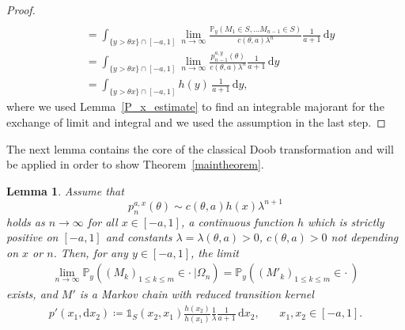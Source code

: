 \documentclass[12pt]{article}
\renewcommand{\P}{\mathbb{P}} %
\newcommand{\1}{\mathds{1}}
\renewcommand{\d}{\mathrm{d}}
\theoremstyle{definition}
\theoremstyle{plain}
\newtheorem{Lemma}[definition]{Lemma}
\theoremstyle{remark}
\begin{document}
\begin{proof}
\begin{align*}
      \\&\overset{ }{=}\int_{\{y>\theta x\}\cap[-a,1]}\lim_{n\to\infty}\frac{\P_y(M_1\in S,\dots M_{n-1}\in S)}{c(\theta,a)\lambda^{n}}\frac{1}{a+1}\,\d y
      \\&=\int_{\{y>\theta x\}\cap[-a,1]}\lim_{n\to\infty}\frac{p_{n-1}^{a,y}(\theta)}{c(\theta,a)\lambda^{n}}\frac{1}{a+1}\,\d y
      \\&=\int_{\{y>\theta x\}\cap[-a,1]}h(y)\,\frac{1}{a+1}\,\d y,
\end{align*}
where we used Lemma~\ref{P_x_estimate} to find an integrable majorant for the exchange of limit and integral and we used the assumption in the last step. %
\end{proof}
The next lemma contains the core of the classical Doob transformation and will be applied in order to show Theorem~\ref{maintheorem}.
\begin{Lemma}\label{Prob=Lim_int_trans_kernel}
Assume that
  $$p_n^{a,x}(\theta)\sim c(\theta,a)h(x)\lambda^{n+1}$$
   holds as $n\to\infty$ for all $x\in[-a,1]$, a continuous function $h$ which is strictly positive on $[-a,1]$ and constants $\lambda=\lambda(\theta,a)>0$, $c(\theta,a)>0$ not depending on $x$ or $n$.
Then, for any $y\in[-a,1]$, the limit
\begin{align*}
    \lim_{n\to\infty}\P_y((M_k)_{1\leq k\leq m}\in\cdot~|\Omega_n)=\P_y((M'_k)_{1\leq k\leq m}\in\cdot~)
\end{align*}
exists, and $M'$ is a Markov chain with reduced transition kernel 
\begin{align} \label{eqn:generalkernel2}
    p'(x_1,\d x_2)\coloneqq \mathds{1}_S(x_2,x_1)\frac{h(x_2)}{h(x_{1})}\frac{1}{\lambda}\frac{1}{a+1}\,\d x_2,~~~~~~~~x_1,x_2\in[-a,1].
\end{align}
\end{Lemma}
\end{document}
